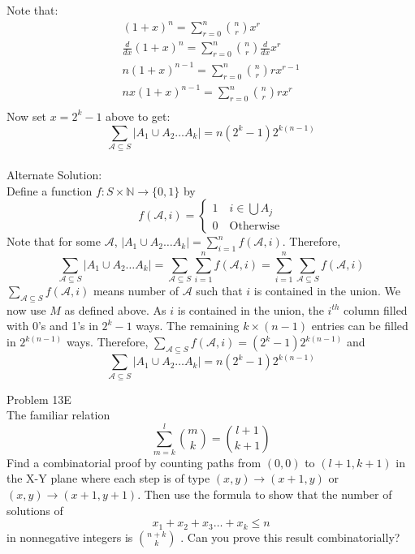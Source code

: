 \documentclass{tufte-book}
\begin{document}
Note that:
\begin{align*}
	(1+x)^n=\sum_{r=0}^n{n\choose r}x^r\\
	\frac{d}{dx}(1+x)^n=\sum_{r=0}^n{n\choose r}\frac{d}{dx}x^r\\
	n(1+x)^{n-1}=\sum_{r=0}^n{n\choose r}rx^{r-1}\\
	nx(1+x)^{n-1}=\sum_{r=0}^n{n\choose r}rx^r\\
\end{align*}
Now set $x=2^k-1$ above to get:
$$\sum_{\mathcal A\subseteq S}|A_1\cup A_2\hdots A_k|=n(2^k-1)2^{k(n-1)}$$
\\\noindent
\large{Alternate Solution:}\\
Define a function $f:S\times\mathbb{N}\to \{0,1\}$ by 
$$f(\mathcal{A},i)=\begin{cases}
	1\quad{i\in\bigcup A_j}\\
	0\quad{\text{Otherwise}}
\end{cases}$$
Note that for some $\mathcal{A}$, $|A_1\cup A_2\hdots A_k|=\sum_{i=1}^nf(\mathcal{A},i)$. Therefore, 
$$\sum_{\mathcal A\subseteq S}|A_1\cup A_2\hdots A_k|=\sum_{\mathcal A\subseteq S}\sum_{i=1}^nf(\mathcal{A},i)=\sum_{i=1}^n\sum_{\mathcal A\subseteq S}f(\mathcal{A},i)$$
$\sum_{\mathcal A\subseteq S}f(\mathcal{A},i)$ means number of $\mathcal{A}$ such that $i$ is contained in the union. We now use $M$ as defined above. As $i$ is contained in the union, the $i^{th}$ column filled with 0's and 1's in $2^{k}-1$ ways. The remaining $k\times (n-1)$ entries can be filled in $2^{k(n-1)}$ ways. Therefore, $\sum_{\mathcal A\subseteq S}f(\mathcal{A},i)=(2^k-1)2^{k(n-1)}$ and  
$$\sum_{\mathcal A\subseteq S}|A_1\cup A_2\hdots A_k|=n(2^k-1)2^{k(n-1)}$$


\begin{tcolorbox}[colback=red!10!white]
	\large{Problem 13E}\\
	The familiar relation
	$$\sum_{m=k}^l{m\choose k}={l+1\choose k+1}$$
	Find a combinatorial proof
by counting paths from $(0,0)$ to $(l+1, k+1)$ in the X-Y plane where
each step is of type $(x, y) \to (x + 1, y)$ or $(x, y) \to (x + 1, y + 1)$.
Then use the formula to show that the number of solutions of
$$x_1+x_2+x_3\hdots +x_k\leq n$$
in nonnegative integers is $n+k\choose k$
. Can you prove this result combinatorially?
\end{tcolorbox}
\end{document}
